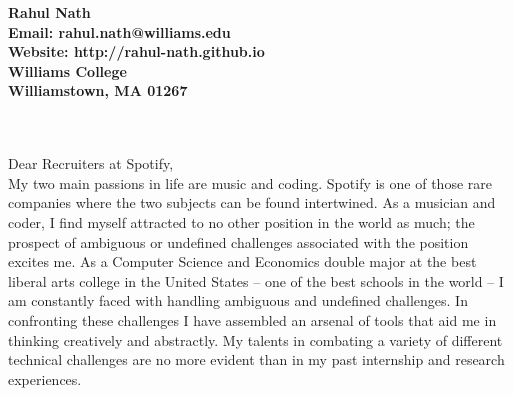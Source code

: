 \documentclass[11pt]{letter} %
\newcommand{\forceindent}{\leavevmode{\parindent=24pt\indent}}
\begin{document}



\begin{center}
\large\bf Rahul Nath \\ %
Email: rahul.nath@williams.edu \\ Website: http://rahul-nath.github.io \\ Williams College \\ Williamstown, MA 01267
\end{center}

\\ \\
Dear Recruiters at Spotify,\\

\forceindent My two main passions in life are music and coding. Spotify is one of those rare companies where the two subjects can be found intertwined. As a musician and coder, I find myself attracted to no other position in the world as much; the prospect of ambiguous or undefined challenges associated with the position excites me. As a Computer Science and Economics double major at the best liberal arts college in the United States -- one of the best schools in the world -- I am constantly faced with handling ambiguous and undefined challenges. In confronting these challenges I have assembled an arsenal of tools that aid me in thinking creatively and abstractly. My talents in combating a variety of different technical challenges are no more evident than in my past internship and research experiences. \\
\end{document}
